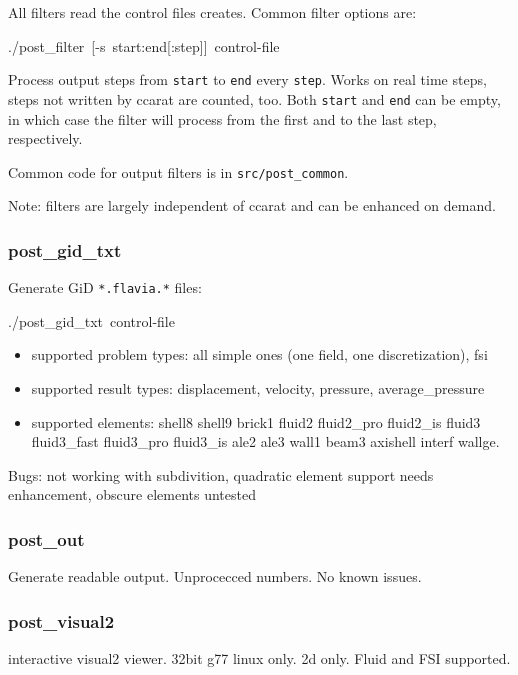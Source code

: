 All filters read the control files \ccarat{} creates. Common filter
options are:

\begin{lyxcode}
./post\_filter~{[}-s~start:end{[}:step]]~control-file
\end{lyxcode}
Process output steps from \texttt{start} to \texttt{end} every \texttt{step}.
Works on real time steps, steps not written by ccarat are counted,
too. Both \texttt{start} and \texttt{end} can be empty, in which case
the filter will process from the first and to the last step, respectively.

Common code for output filters is in \texttt{src/post\_common}.

Note: filters are largely independent of ccarat and can be enhanced
on demand.


\subsubsection{post\_gid\_txt}

Generate GiD \texttt{{*}.flavia.{*}} files:

\begin{lyxcode}
./post\_gid\_txt~control-file
\end{lyxcode}
\begin{itemize}
\item supported problem types: all simple ones (one field, one discretization),
fsi
\item supported result types: displacement, velocity, pressure, average\_pressure
\item supported elements: shell8 shell9 brick1 fluid2 fluid2\_pro fluid2\_is
fluid3 fluid3\_fast fluid3\_pro fluid3\_is ale2 ale3 wall1 beam3 axishell
interf wallge.
\end{itemize}
Bugs: not working with subdivition, quadratic element support needs
enhancement, obscure elements untested


\subsubsection{post\_out}

Generate readable output. Unprocecced numbers. No known issues.


\subsubsection{post\_visual2}

interactive visual2 viewer. 32bit g77 linux only. 2d only. Fluid and
FSI supported.


